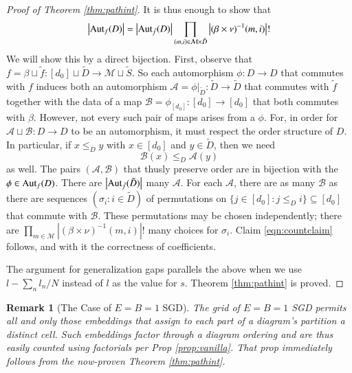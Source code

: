\documentclass[anon,12pt]{colt2021} %
\newtheorem{rmk}{Remark}
\newcommand{\wabs}[1]{\left|#1\right|}
\newcommand{\Aut}{\text{\textnormal{Aut}}}
\newcommand{\Aa}{\mathcal{A}}
\newcommand{\Bb}{\mathcal{B}}
\newcommand{\Mm}{\mathcal{M}}
\begin{document}
{\begin{proof}[Proof of Theorem \ref{thm:pathint}]
            It is thus enough to show that
            \begin{align*} \label{eqn:countclaim}
                \wabs{\Aut_f(D)} = 
                \wabs{\Aut_{\tilde f}(D)}
                \prod_{(m, i) \in \Mm \times \tilde D}
                    \wabs{(\beta \times \nu)^{-1}(m, i)}!
            \end{align*}
            We will show this by a direct bijection.  First, observe that
            $
                f = \beta \sqcup \tilde f:
                    [d_0] \sqcup \tilde D \to \Mm \sqcup \tilde S
            $. 
            So each automorphism $\phi: D\to D$ that commutes with $f$ induces
            both an automorphism
            $
                \Aa = \phi|_{\tilde D}: \tilde D\to \tilde D
            $
            that commutes with $\tilde f$ together with the data of a map
            $
                \Bb = \phi_{[d_0]}: [d_0] \to [d_0] 
            $
            that both commutes with $\beta$.  However, not every such pair of
            maps arises from a $\phi$.  For, in order for $\Aa \sqcup \Bb: D
            \to D$ to be an automorphism, it must respect the order structure
            of $D$.  In particular, if $x\leq_D y$ with $x \in [d_0]$ and $y
            \in \tilde D$, then we need
            $$
                \Bb(x) \leq_D \Aa(y)
            $$
            as well.  The
            pairs $(\Aa, \Bb)$ that thusly preserve order are in bijection with
            the $\phi \in \Aut_f(D)$.  There are $\wabs{\Aut_{\tilde f}(\tilde
            D)}$ many $\Aa$.  For each $\Aa$, there are as many $\Bb$ as there
            are sequences $(\sigma_i: i \in \tilde D)$ of permutations on
            $
                \{j\in [d_0]: j\leq_D i\} \subseteq [d_0]
            $ 
            that commute with $\Bb$.  These permutations may be chosen
            independently; there are 
            $
                \prod_{m\in \Mm}
                    \wabs{(\beta \times \nu)^{-1}(m, i)}!
            $
            many choices for $\sigma_i$.  Claim \ref{eqn:countclaim} follows,
            and with it the correctness of coefficients.
 
            The argument for generalization gaps parallels the above when we
            use $l-\sum_n l_n/N$ instead of $l$ as the value for $s$. 
            Theorem \ref{thm:pathint} is proved.
        \end{proof}

        \begin{rmk}[The Case of $E=B=1$ SGD]
            The grid of $E=B=1$ SGD permits all and only those
            embeddings that assign to each part of a diagram's partition  a
            distinct cell.  Such embeddings factor through a diagram
            ordering and are thus easily counted using factorials per
            Prop \ref{prop:vanilla}.  That prop immediately
            follows from the now-proven Theorem \ref{thm:pathint}.
        \end{rmk}

}
\end{document}
